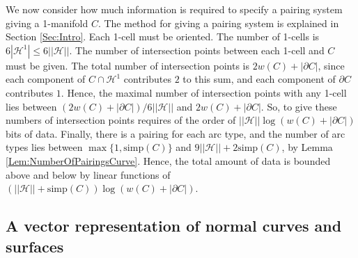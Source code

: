 \documentclass[oneside]{amsart}
\numberwithin{equation}{section}
\theoremstyle{plain}
\newtheorem{lemma}[equation]{Lemma}
\theoremstyle{definition}
\newcommand{\calT}{{\mathcal{T}}}
\newcommand{\cut}{\backslash\backslash}
\newcommand{\calH}{\mathcal{H}}
\begin{document}


We now consider how much information is required to specify a pairing system giving a 1-manifold $C$. The method for giving a pairing system is explained in Section \ref{Sec:Intro}. Each 1-cell must be oriented. The number of 1-cells is $6|\calH^1| \leq 6||\calH||$. The number of intersection points between each 1-cell and $C$ must be given. The total number of intersection points is $2w(C) + |\partial C|$, since each component of $C \cap \calH^1$ contributes $2$ to this sum, and each component of $\partial C$ contributes $1$. Hence, the maximal number of intersection points with any 1-cell lies between $(2w(C) + |\partial C|)/6||\calH||$ and $2w(C) + |\partial C|$. So, to give these numbers of intersection points requires of the order of $||\calH|| \log (w(C) + |\partial C|)$ bits of data. Finally, there is a pairing for each arc type, and the number of arc types lies between $\max \{ 1, \mathrm{simp}(C) \}$ and $9||\calH|| + 2\mathrm{simp}(C)$, by Lemma \ref{Lem:NumberOfPairingsCurve}. Hence, the total amount of data is bounded above and below by linear functions of $(||\calH|| + \mathrm{simp}(C)) \log (w(C) + |\partial C|)$.

\subsection{A vector representation of normal curves and surfaces}
\label{Sec:Vector}
\end{document}
